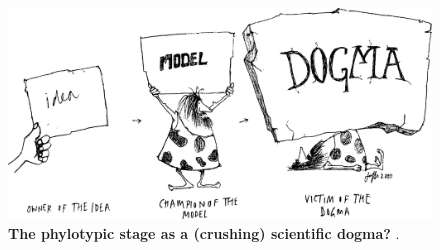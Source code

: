 \begin{figure}
    \includegraphics[width=\linewidth]{ch.discussion/imgs/dogma.png}
    \caption{\textbf{The phylotypic stage as a (crushing) scientific dogma?} \cite{Caveman2000}.}
    \label{fig:dogma}
\end{figure}

